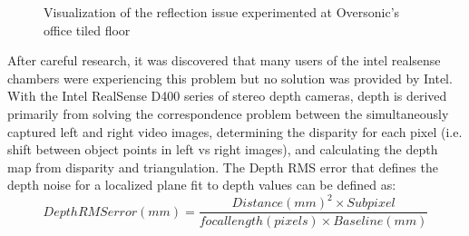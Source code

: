 \begin{figure}[H]
     \centering
     \hfill
     \caption{Visualization of the reflection issue experimented at Oversonic's office tiled floor}
     \label{tiled_floor}
\end{figure}

After careful research, it was discovered that many users of the intel realsense chambers were experiencing this problem but no solution was provided by Intel.
With the Intel RealSense D400 series of stereo depth cameras, depth is derived primarily from solving the correspondence problem between the simultaneously captured left and right video images, determining the disparity for each pixel (i.e. shift between object points in left vs right images), and calculating the depth map from disparity and triangulation.
The Depth RMS error that defines the depth noise for a localized plane fit to depth values can be defined as:
\begin{equation}
    Depth RMS error (mm) = \frac{Distance(mm)^2 \times Subpixel}{focal length(pixels) \times Baseline(mm)}
\end{equation}

